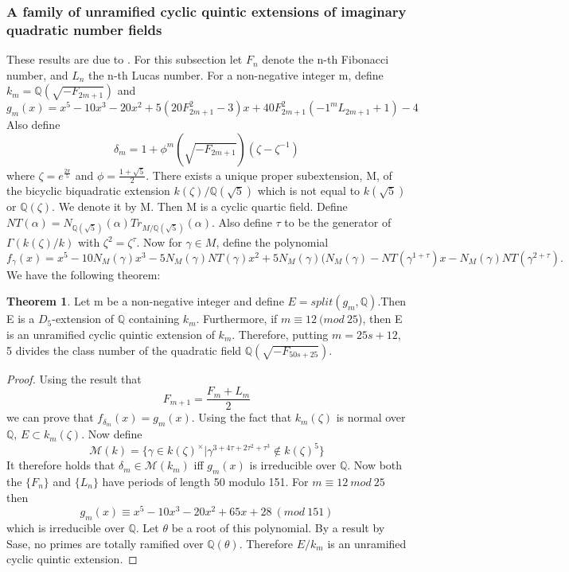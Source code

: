 \documentclass[12pt]{extarticle}
\newcommand{\Q}{\mathbb{Q}}
\newcommand{\<}{\langle}
\renewcommand{\>}{\rangle}
\theoremstyle{definition}
\newtheorem{theorem}{Theorem}
\begin{document}
\subsubsection{A family of unramified cyclic quintic extensions of imaginary quadratic number fields}
These results are due to \cite{KISH}. For this subsection let $F_n$ denote the n-th Fibonacci number, and $L_n$ the n-th Lucas number. For a non-negative integer m, define $k_m = \Q(\sqrt{-F_{2m+1}})$ and \begin{equation}
    g_m(x) = x^5 - 10x^3  -20x^2 + 
    5(20F^2_{2m+1} - 3)x
    + 40F^2_{2m+1}(-1^{m}L_{2m+1} + 1)- 4
\end{equation} 
Also define \begin{equation}
    \delta_m = 1+\phi^m(\sqrt{-F_{2m+1}})(\zeta-\zeta^{-1})
\end{equation} where $\zeta = e^{\frac{2\pi}{5}}$ and $\phi = \frac{1+\sqrt{5}}{2}$. There exists a unique proper subextension, M, of the bicyclic biquadratic
extension $k(\zeta)/\Q(\sqrt{5})$ which is not equal to $k(\sqrt{5})$ or $\Q(\zeta)$. We denote it by M. Then M is a cyclic quartic field. Define $NT(\alpha) = N_{\Q(\sqrt{5})}(\alpha)Tr_{M/\Q(\sqrt{5})}(\alpha)$. Also define $\tau$ to be the generator of $\Gamma(k(\zeta)/k)$ with $\zeta^2=\zeta^\tau$.
Now for $\gamma \in M$, define the polynomial \begin{equation}
    f_\gamma(x) = x^5 - 10N_M(\gamma)x^3 - 5N_M(\gamma)NT (\gamma)x^2
+ 5N_M(\gamma)(N_M(\gamma) - NT(\gamma^{1+\tau})x - N_M(\gamma)NT(\gamma^{2+\tau}) 
.
\end{equation}
We have the following theorem: \begin{theorem}
    Let m be a non-negative integer and define $E = split(g_m,\Q)$.Then E is a $D_5$-extension
of $\Q$ containing $k_m$. Furthermore, if $m \equiv 12 \:(mod\:25$), then E is an unramified cyclic quintic extension of $k_m$. Therefore, putting $m = 25s + 12$, 5 divides the class number of the quadratic field $\Q(\sqrt{-F_{50s+25}})$.
\end{theorem}
\begin{proof}
Using the result that \begin{equation}
    F_{m+1}= \frac{F_m + L_m}{2}
\end{equation}
we can prove that $f_{\delta_m}(x) = g_m(x)$. Using the fact that $k_m(\zeta)$ is normal over $\Q$, $E\subset k_m(\zeta)$. Now define  \begin{equation}
    \mathcal{M}(k)=\{\gamma \in k(\zeta)^{\times}|\gamma^{3+4\tau+2\tau^{2}+\tau^3}\notin k(\zeta)^5\}
\end{equation}
It therefore holds that $\delta_m \in \mathcal{M}(k_m)$ iff $g_m(x)$ is irreducible over $\Q$. Now both the $\{F_n\}$ and $\{L_n\}$ have periods of length 50 modulo 151. For $m\equiv12 \: mod \: 25$ then \begin{equation}
    g_m(x) \equiv x^5 - 10x^3 - 20x^2 + 65x + 28\:(mod \:151)
\end{equation} which is irreducible over $\Q$. Let $\theta$ be a root of this polynomial. By a result by Sase, no primes are totally ramified over $\Q(\theta)$. Therefore $E/k_m$ is an unramified cyclic quintic extension. 
\end{proof}
\end{document}
